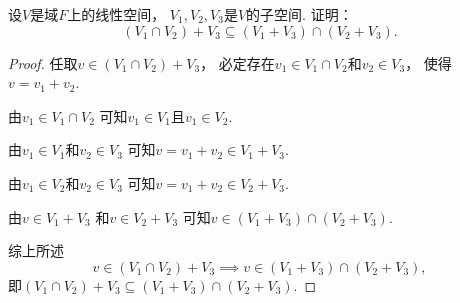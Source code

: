 \begin{example}
设\(V\)是域\(F\)上的线性空间，
\(V_1,V_2,V_3\)是\(V\)的子空间.
证明：\begin{equation}
	(V_1 \cap V_2) + V_3 \subseteq (V_1 + V_3) \cap (V_2 + V_3).
\end{equation}
\begin{proof}
任取\(v \in (V_1 \cap V_2) + V_3\)，
必定存在\(v_1 \in V_1 \cap V_2\)和\(v_2 \in V_3\)，
使得\(v = v_1 + v_2\).

由\(v_1 \in V_1 \cap V_2\)
可知\(v_1 \in V_1\)且\(v_1 \in V_2\).

由\(v_1 \in V_1\)和\(v_2 \in V_3\)
可知\(v = v_1 + v_2 \in V_1 + V_3\).

由\(v_1 \in V_2\)和\(v_2 \in V_3\)
可知\(v = v_1 + v_2 \in V_2 + V_3\).

由\(v \in V_1 + V_3\)
和\(v \in V_2 + V_3\)
可知\(v \in (V_1 + V_3) \cap (V_2 + V_3)\).

综上所述\begin{equation*}
	v \in (V_1 \cap V_2) + V_3
	\implies
	v \in (V_1 + V_3) \cap (V_2 + V_3),
\end{equation*}
即\((V_1 \cap V_2) + V_3 \subseteq (V_1 + V_3) \cap (V_2 + V_3)\).
\end{proof}
\end{example}


